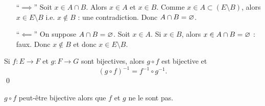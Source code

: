 \begin{prv}
	\begin{itemize}
		\item[``$\implies$''] Soit $x \in A \cap B$. Alors $x \in A$ et $x \in B$. Comme $x \in A \subset (E \setminus B)$, alors $x \in E \setminus B$ i.e. $x \not\in B$ : une contradiction. Donc $A \cap B = \varnothing$.
		\item[``$\impliedby$''] On suppose $A \cap B = \varnothing$. Soit $x \in A$. Si $x \in B$, alors $x \in A \cap B = \varnothing$ : faux.
			Donc $x \not\in B$ et donc $x \in E \setminus B$.
	\end{itemize}
\end{prv}

\begin{prop}
	Si $f: E\to F$ et $g: F \to G$ sont bijectives, alors $g \circ f$ est bijective et \[
		(g \circ f)^{-1} = f^{-1} \circ g^{-1}.
	\] \qed
\end{prop}

\begin{rmk}
	$g \circ f$ peut-être bijective alors que $f$ et $g$ ne le sont pas.
\end{rmk}

